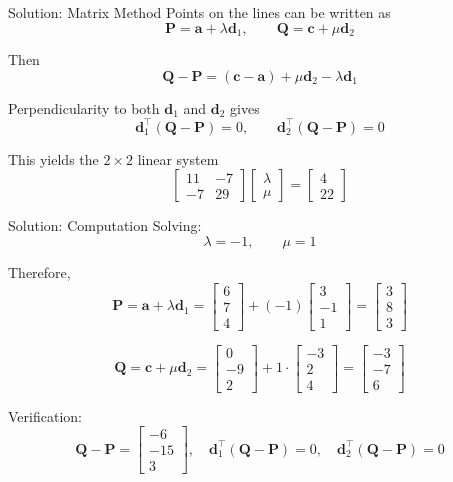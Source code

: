 \documentclass{beamer}
\renewcommand{\vec}[1]{\mathbf{#1}}
\begin{document}
\begin{frame}{Solution: Matrix Method}
\small
Points on the lines can be written as
\[
\vec{P}=\vec{a}+\lambda\vec{d}_1, \qquad
\vec{Q}=\vec{c}+\mu\vec{d}_2
\]

Then
\[
\vec{Q}-\vec{P}=(\vec{c}-\vec{a})+\mu\vec{d}_2-\lambda\vec{d}_1
\]

Perpendicularity to both $\vec{d}_1$ and $\vec{d}_2$ gives
\[
\vec{d}_1^{\top}(\vec{Q}-\vec{P})=0, \qquad
\vec{d}_2^{\top}(\vec{Q}-\vec{P})=0
\]

This yields the $2\times 2$ linear system
\[
\begin{bmatrix}
11 & -7 \\ 
-7 & 29
\end{bmatrix}
\begin{bmatrix}
\lambda \\ \mu
\end{bmatrix}
=
\begin{bmatrix}
4 \\ 22
\end{bmatrix}
\]
\end{frame}

\begin{frame}{Solution: Computation}
\small
Solving:
\[
\lambda=-1,\qquad \mu=1
\]

Therefore,
\[
\vec{P}=\vec{a}+\lambda\vec{d}_1
=\begin{bmatrix}6\\7\\4\end{bmatrix}+\left(-1\right)\begin{bmatrix}3\\-1\\1\end{bmatrix}
=\begin{bmatrix}3\\8\\3\end{bmatrix}
\]

\[
\vec{Q}=\vec{c}+\mu\vec{d}_2
=\begin{bmatrix}0\\-9\\2\end{bmatrix}+1\cdot\begin{bmatrix}-3\\2\\4\end{bmatrix}
=\begin{bmatrix}-3\\-7\\6\end{bmatrix}
\]

Verification:
\[
\vec{Q}-\vec{P}=\begin{bmatrix}-6\\-15\\3\end{bmatrix}, \quad
\vec{d}_1^{\top}(\vec{Q}-\vec{P})=0,\quad
\vec{d}_2^{\top}(\vec{Q}-\vec{P})=0
\]
\end{frame}
\end{document}
